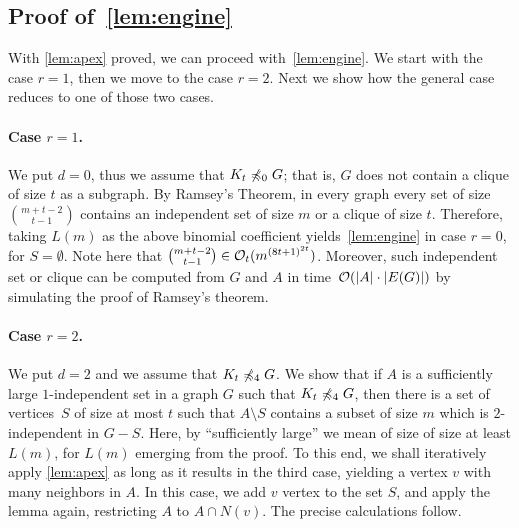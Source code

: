 
\subsection{Proof of~\cref{lem:engine}}
\label{sec:engine}

With \cref{lem:apex} proved, we can proceed with~\cref{lem:engine}. 
We start with the case $r=1$, then we move to the case $r=2$. 
Next we show how the general case reduces to one of those two cases.

\paragraph{Case $r=1$.}
We put $d=0$, thus we assume that $K_t\not\preccurlyeq_0 G$; that is, $G$ does not contain a clique of size $t$ as a subgraph. By Ramsey's Theorem, in every graph every set of size $\binom{m+t-2}{t-1}$ contains an
independent set of size $m$ or a clique of size $t$. Therefore, 
taking $L(m)$ as the above binomial coefficient yields~\cref{lem:engine} in case $r=0$, for $S=\emptyset$. Note here that $\binom{m+t-2}{t-1}\in\mathcal{O}_{t}{(m^{{(8t+1)}^{2t}})}$.
Moreover, such independent set or clique can be computed from $G$ and $A$ in time~$\mathcal{O}(|A|\cdot |E(G)|)$ by simulating the proof of Ramsey's theorem.

\paragraph{Case $r=2$.}
We put $d=2$ and we assume that $K_t\not\preccurlyeq_4 G$.
We show that if $A$ is a sufficiently large $1$-independent set in a graph $G$ such that $K_t\not\preccurlyeq_4 G$, 
then there is a set of vertices~$S$ of size at most $t$ such that $A\setminus S$ contains a subset of size $m$ which is $2$-independent in $G-S$. 
Here, by ``sufficiently large'' we mean of size of size at least $L(m)$, for $L(m)$ emerging from the proof.
To this end, we shall iteratively apply \cref{lem:apex} as long as  it results in the third case, 
yielding a vertex $v$ with many neighbors in $A$. In this case, we add $v$ vertex to the set $S$, and apply the lemma again,
restricting $A$ to $A\cap N(v)$. 
The precise calculations follow.

